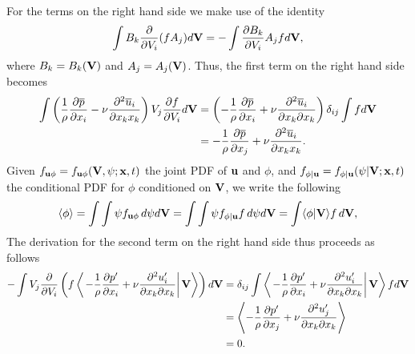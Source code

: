 \documentclass[oneside,a4paper,11pt]{report}
\newcommand{\pavg}{\overline{p}}
\newcommand{\uavg}{\overline{u}}
\newcommand{\pfluc}{p'}
\newcommand{\ufluc}{u'}
\begin{document}
For the terms on the right hand side we make use of the identity
\begin{equation}
\int B_k \frac{\partial}{\partial V_i} ( f A_j ) d\mathbf{V} = - \int \frac{\partial B_k}{\partial V_i} A_j f d\mathbf{V},
\end{equation}
where $B_k = B_k(\mathbf{V})$ and $A_j = A_j(\mathbf{V})$.
Thus, the first term on the right hand side becomes
\begin{align}
\int \left ( \frac{1}{\rho} \frac{\partial \pavg}{\partial x_i} -\nu \frac{\partial^2 \uavg_i}{\partial x_k x_k} \right) V_j \frac{\partial f}{\partial V_i} d\Vvec & = \left (- \frac{1}{\rho} \frac{\partial \pavg}{\partial x_i} + \nu \frac{\partial^2 \uavg_i}{\partial x_k \partial x_k} \right) \delta_{ij} \int f d\Vvec \nonumber \\
& = -\frac{1}{\rho} \frac{\partial \pavg}{\partial x_j} + \nu \frac{\partial ^2 \uavg_i}{\partial x_k x_k}.
\end{align}
Given $f_{\mathbf{u} \phi} = f_{\mathbf{u} \phi}(\mathbf{V}, \psi; \mathbf{x}, t)$ the joint PDF of $\mathbf{u}$ and $\phi$, and $f_{\phi | \mathbf{u}} = f_{\phi | \mathbf{u}}(\psi | \mathbf{V}; \mathbf{x}, t)$ the conditional PDF for $\phi$ conditioned on $\mathbf{V}$, we write the following 
\begin{equation}
\langle \phi \rangle = \int \int \psi f_{\mathbf{u} \phi} \, d\psi d\mathbf{V} = \int \int \psi f_{\phi | \mathbf{u}} f \, d\psi d\mathbf{V} = \int \langle \phi | \mathbf{V} \rangle f \, d\mathbf{V},
\end{equation}
The derivation for the second term on the right hand side thus proceeds as follows
\begin{align}
-\int V_j \frac{\partial}{\partial V_i} \left ( f \left < \left . - \frac{1}{\rho} \frac{\partial \pfluc}{\partial x_i} + \nu \frac{\partial^2 \ufluc_i}{\partial x_k \partial x_k} \right | \Vvec \right > \right ) d\Vvec &= \delta_{ij} \int \left < \left . - \frac{1}{\rho} \frac{\partial \pfluc}{\partial x_i} + \nu \frac{\partial^2 \ufluc_i}{\partial x_k \partial x_k} \right | \Vvec \right > f d\Vvec \nonumber \\
& = \left < - \frac{1}{\rho} \frac{\partial \pfluc}{\partial x_j} + \nu \frac{\partial^2 \ufluc_j}{\partial x_k \partial x_k} \right > \nonumber \\
& = 0.
\end{align}
\end{document}

